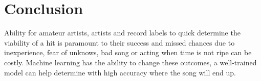 \documentclass[9pt,twocolumn,twoside]{../../styles/osajnl}
\begin{document}
\section{Conclusion}

Ability for amateur artists, artists and record labels to quick
determine the viability of a hit is paramount to their success and
missed chances due to inexperience, fear of unknows, bad song or
acting when time is not ripe can be costly. Machine learning has the
ability to change these outcomes, a well-trained model can help
determine with high accuracy where the song will end up. 




 
\end{document}
